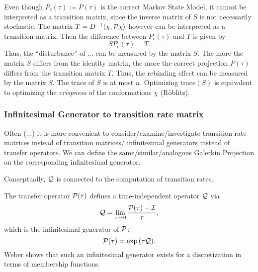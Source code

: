 Even though $P_c(\tau) := P(\tau)$ is the correct Markov State Model, it cannot be interpreted as a transition matrix, since the inverse matrix of $S$ is not necessarily stochastic.
The matrix $T = D^{-1} \langle \chi, \mathcal{P} \chi \rangle$ however can be interpreted as a transition matrix. Then the difference between $P_c(\tau)$ and $T$ is given by
\begin{equation*}
S P_c(\tau) = T.
\end{equation*}
Thus, the ``disturbance'' of ... can be measured by the matrix $S$.
The more the matrix $S$ differs from the identity matrix, the more the correct projection $P(\tau)$ differs from the transition matrix $T$. Thus, the rebinding effect can be measured by the matrix $S$.
The trace of $S$ is at most $n$. Optimizing $\mathrm{trace}(S)$ is equivalent to optimizing the \textit{crispness} of the conformations $\chi$ (Röblitz).


\subsubsection*{Infinitesimal Generator to transition rate matrix}

Often (...) it is more convenient to consider/examine/investigate transition rate matrices instead of transition matrices/ infinitesimal generators instead of transfer operators. We can define the same/similar/analogous Galerkin Projection on the corresponding infinitesimal generator.

Conceptually, $\mathcal{Q}$ is connected to the computation of transition rates.

The transfer operator $\mathcal{P}(\tau)$ defines a time-independent operator $\mathcal{Q}$ via
\begin{equation*}
\mathcal{Q} = \lim_{\tau \rightarrow 0} \frac{\mathcal{P}(\tau)-\mathcal{I}}{\tau},
\end{equation*}
which is the infinitesimal generator of $\mathcal{P}$: 
\begin{equation*}
\mathcal{P}(\tau) = \exp{(\tau\mathcal{Q})}.
\end{equation*}
Weber\cite{weber2011subspace} shows that such an infinitesimal generator exists for a discretization in terms of membership functions.

